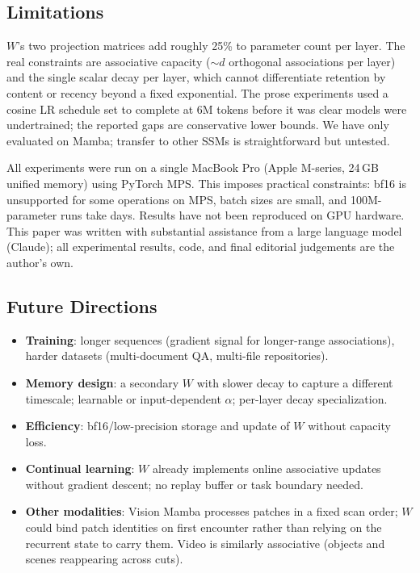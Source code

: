\documentclass{article}
\begin{document}
\subsection*{Limitations}
$W$'s two projection matrices add roughly 25\% to parameter count per layer. The real constraints are associative capacity (${\sim}d$ orthogonal associations per layer) and the single scalar decay per layer, which cannot differentiate retention by content or recency beyond a fixed exponential. The prose experiments used a cosine LR schedule set to complete at 6M tokens before it was clear models were undertrained; the reported gaps are conservative lower bounds. We have only evaluated on Mamba; transfer to other SSMs is straightforward but untested.

All experiments were run on a single MacBook Pro (Apple M-series, 24\,GB unified memory) using PyTorch MPS. This imposes practical constraints: bf16 is unsupported for some operations on MPS, batch sizes are small, and 100M-parameter runs take days. Results have not been reproduced on GPU hardware. This paper was written with substantial assistance from a large language model (Claude); all experimental results, code, and final editorial judgements are the author's own.

\subsection*{Future Directions}
\begin{itemize}
  \item \textbf{Training}: longer sequences (gradient signal for longer-range associations), harder datasets (multi-document QA, multi-file repositories).
  \item \textbf{Memory design}: a secondary $W$ with slower decay to capture a different timescale; learnable or input-dependent $\alpha$; per-layer decay specialization.
  \item \textbf{Efficiency}: bf16/low-precision storage and update of $W$ without capacity loss.
  \item \textbf{Continual learning}: $W$ already implements online associative updates without gradient descent; no replay buffer or task boundary needed.
  \item \textbf{Other modalities}: Vision Mamba processes patches in a fixed scan order; $W$ could bind patch identities on first encounter rather than relying on the recurrent state to carry them. Video is similarly associative (objects and scenes reappearing across cuts).
\end{itemize}
\end{document}
